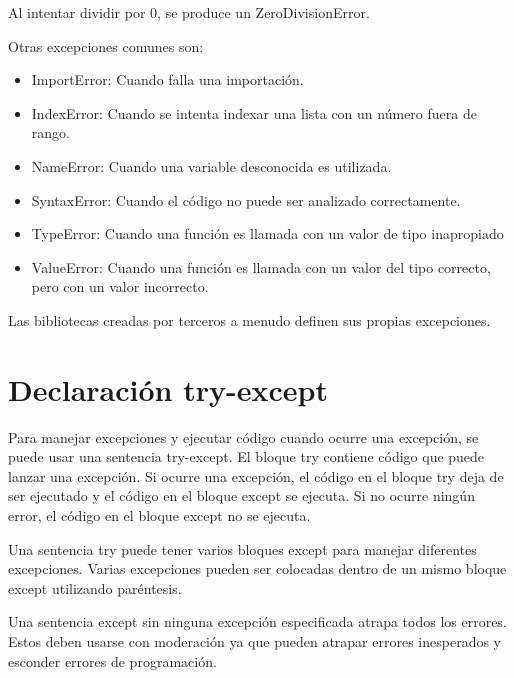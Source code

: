 \documentclass{report}
\begin{document}
Al intentar dividir por 0, se produce un ZeroDivisionError.


Otras excepciones comunes son:

\begin{itemize}
  \item ImportError: Cuando falla una importación.
  \item IndexError: Cuando se intenta indexar una lista con un número fuera de rango.
  \item NameError: Cuando una variable desconocida es utilizada.
  \item SyntaxError: Cuando el código no puede ser analizado correctamente.
  \item TypeError: Cuando una función es llamada con un valor de tipo inapropiado
  \item ValueError: Cuando una función es llamada con un valor del tipo correcto, pero con un valor incorrecto.
\end{itemize}

Las bibliotecas creadas por terceros a menudo definen sus propias excepciones.

\section{Declaración try-except}

Para manejar excepciones y ejecutar código cuando ocurre una excepción, se puede usar una sentencia try-except. El bloque try contiene código que puede lanzar una excepción. Si ocurre una excepción, el código en el bloque try deja de ser ejecutado y el código en el bloque except se ejecuta. Si no ocurre ningún error, el código en el bloque except no se ejecuta.


Una sentencia try puede tener varios bloques except para manejar diferentes excepciones. Varias excepciones pueden ser colocadas dentro de un mismo bloque except utilizando paréntesis.


Una sentencia except sin ninguna excepción especificada atrapa todos los errores. Estos deben usarse con moderación ya que pueden atrapar errores inesperados y esconder errores de programación.

\end{document}
